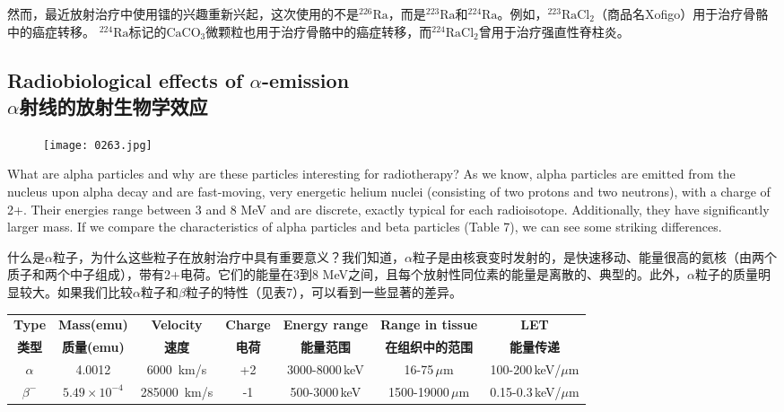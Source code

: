 \documentclass[dvipsnames, svgnames,a4paper,11pt]{article}
\begin{document}
然而，最近放射治疗中使用镭的兴趣重新兴起，这次使用的不是\(\mathrm{^{226}Ra}\)，而是\(\mathrm{^{223}Ra}\)和\(\mathrm{^{224}Ra}\)。例如，\(\mathrm{^{223}RaCl_2}\)（商品名Xofigo）用于治疗骨骼中的癌症转移。 \(\mathrm{^{224}Ra}\)标记的\(\mathrm{CaCO_3}\)微颗粒也用于治疗骨骼中的癌症转移，而\(\mathrm{^{224}RaCl_2}\)曾用于治疗强直性脊柱炎。

\subsection{Radiobiological effects of \(\alpha\)-emission \\ \(\alpha\)射线的放射生物学效应}  

\begin{wrapfigure}{r}{0.4\textwidth}
	\centering
    \texttt{[image: 0263.jpg]}  
     \label{fig353}
\end{wrapfigure}

What are alpha particles and why are these particles interesting for radiotherapy? As we know, alpha particles are emitted from the nucleus upon alpha decay and are fast-moving, very energetic helium nuclei (consisting of two protons and two neutrons), with a charge of 2+. Their energies range between 3 and 8 MeV and are discrete, exactly typical for each radioisotope. Additionally, they have significantly larger mass. If we compare the characteristics of alpha particles and beta particles (Table 7), we can see some striking differences.  

什么是$\alpha$粒子，为什么这些粒子在放射治疗中具有重要意义？我们知道，$\alpha$粒子是由核衰变时发射的，是快速移动、能量很高的氦核（由两个质子和两个中子组成），带有2+电荷。它们的能量在3到8 MeV之间，且每个放射性同位素的能量是离散的、典型的。此外，$\alpha$粒子的质量明显较大。如果我们比较$\alpha$粒子和$\beta$粒子的特性（见表7），可以看到一些显著的差异。  

\begin{table}[h]
      \centering
      \label{table7}
      \begin{tabular}{ccccccc}
      \toprule
      \textbf{Type} & \textbf{Mass(emu)} & \textbf{Velocity } & \textbf{Charge} & \textbf{Energy range } & \textbf{Range in tissue } & \textbf{LET} \\
      \textbf{类型} & \textbf{质量(emu)} & \textbf{速度} & \textbf{电荷} & \textbf{能量范围} & \textbf{在组织中的范围} & \textbf{能量传递} \\
      \midrule
  
       \(\alpha\) & 4.0012 & 6000 \,km/s & +2 & 3000-8000\,keV & 16-75\,$\mu$m & 100-200\,keV/$\mu$m \\
  
       \(\beta^-\) & $5.49\times 10^{-4}$& 285000 \,km/s & -1 & 500-3000\,keV & 1500-19000\,$\mu$m & 0.15-0.3\,keV/$\mu$m \\
      \bottomrule
      \end{tabular}
      \end{table}
\end{document}
